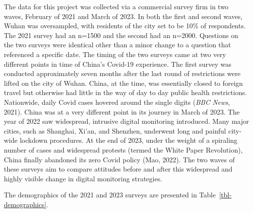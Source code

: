 \documentclass[
  letterpaper,
  DIV=11,
  numbers=noendperiod]{scrartcl}
\begin{document}
The data for this project was collected via a commercial survey firm in
two waves, February of 2021 and March of 2023. In both the first and
second waves, Wuhan was oversampled, with residents of the city set to
be 10\% of respondents. The 2021 survey had an n=1500 and the second had
an n=2000. Questions on the two surveys were identical other than a
minor change to a question that referenced a specific date. The timing
of the two surveys came at two very different points in time of China's
Covid-19 experience. The first survey was conducted approximately seven
months after the last round of restrictions were lifted on the city of
Wuhan. China, at the time, was essentially closed to foreign travel but
otherwise had little in the way of day to day public health
restrictions. Nationwide, daily Covid cases hovered around the single
digits (\emph{BBC News}, 2021). China was at a very different point in
its journey in March of 2023. The year of 2022 saw widespread, intrusive
digital monitoring introduced. Many major cities, such as Shanghai,
Xi'an, and Shenzhen, underwent long and painful city-wide lockdown
procedures. At the end of 2023, under the weight of a spiraling number
of cases and widespread protests (termed the White Paper Revolution),
China finally abandoned its zero Covid policy (Mao, 2022). The two waves
of these surveys aim to compare attitudes before and after this
widespread and highly visible change in digital monitoring strategies.

The demographics of the 2021 and 2023 surveys are presented in
Table~\ref{tbl-demographics}.
\end{document}
